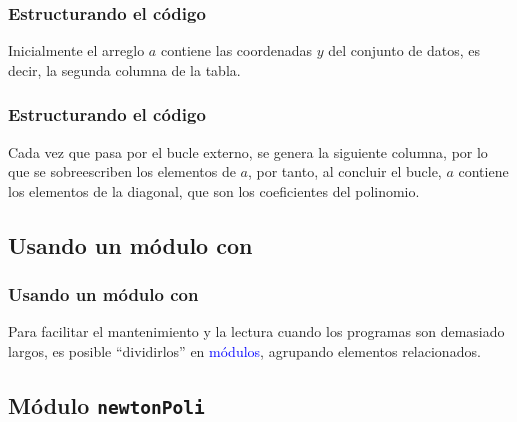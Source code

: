 \documentclass[12pt]{beamer}
\begin{document}
\begin{frame}
\frametitle{Estructurando el código}
Inicialmente el arreglo $a$ contiene las coordenadas $y$ del conjunto de datos, es decir, la segunda columna de la tabla.
\end{frame}
\begin{frame}
\frametitle{Estructurando el código}
Cada vez que pasa por el bucle externo, se genera la siguiente columna, por lo que se sobreescriben los elementos de $a$, por tanto, al concluir el bucle, $a$ contiene los elementos de la diagonal, que son los coeficientes del polinomio.
\end{frame}

\subsection*{Usando un módulo con \python}

\begin{frame}
\frametitle{Usando un módulo con \python}
Para facilitar el mantenimiento y la lectura cuando los programas son demasiado largos, es posible \enquote{dividirlos} en \textcolor{blue}{módulos}, agrupando elementos relacionados.
\end{frame}

\subsection{Módulo \texttt{newtonPoli}}
\end{document}
